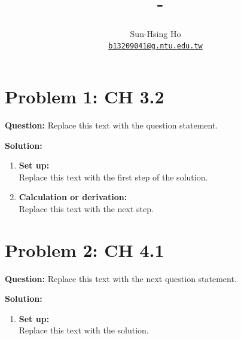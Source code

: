 \documentclass[a4paper, 11pt]{article}
\title{\textbf{\CourseName\ - \CourseTerm}\\ \Large \HomeworkNumber}
\author{
    Sun-Hsing Ho\textsuperscript{\orcidlink{0009-0002-1134-299X}} \\
    \href{mailto:b13209041@g.ntu.edu.tw}{\texttt{b13209041@g.ntu.edu.tw}}
}
\date{\HomeworkDate}
\begin{document}
\maketitle
\thispagestyle{fancy}

\section*{Problem 1: CH 3.2}
\textbf{Question:} Replace this text with the question statement.

\vspace{0.5em}
\noindent\textbf{Solution:}
\begin{enumerate}[label=\textbf{Step \arabic*:}, leftmargin=*]
    \item \textbf{Set up:} \\
    Replace this text with the first step of the solution.

    \item \textbf{Calculation or derivation:} \\
    Replace this text with the next step.
\end{enumerate}

\hrulefill

\section*{Problem 2: CH 4.1}
\textbf{Question:} Replace this text with the next question statement.

\vspace{0.5em}
\noindent\textbf{Solution:}
\begin{enumerate}[label=\textbf{Step \arabic*:}, leftmargin=*]
    \item \textbf{Set up:} \\
    Replace this text with the solution.
\end{enumerate}

\hrulefill
\end{document}
